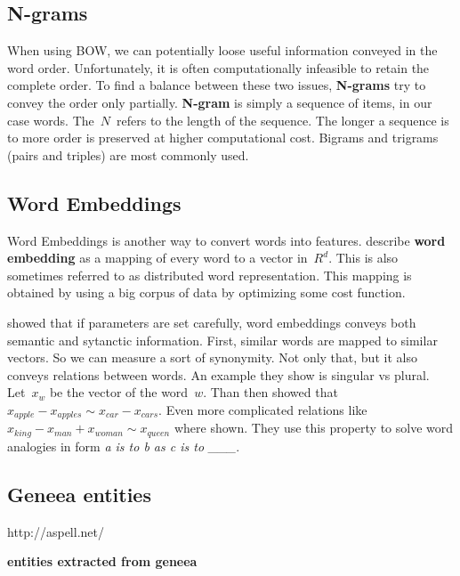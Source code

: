 \subsection{N-grams}

When using BOW, we can potentially loose useful information conveyed in the word order.
Unfortunately, it is often computationally infeasible to retain the complete order.
To find a balance between these two issues, {\bf N-grams} try to convey the order only partially.
{\bf N-gram} is simply a sequence of items, in our case words. The~$N$~refers to the length of the sequence.
The longer a sequence is to more order is preserved at higher computational cost.
Bigrams and trigrams (pairs and triples) are most commonly used.


\subsection{Word Embeddings}
\label{subsec:wordembed}

Word Embeddings is another way to convert words into features.
\citet{LeGo14} describe {\bf word embedding} as a mapping of every word to a vector in~$R^d$.
This is also sometimes referred to as distributed word representation.
This mapping is obtained by using a big corpus of data by optimizing some cost function.

\citet{Mik13} showed that if parameters are set carefully, word embeddings conveys both semantic and sytanctic information.
First, similar words are mapped to similar vectors. So we can measure a sort of synonymity.
Not only that, but it also conveys relations between words.
An example they show is singular vs plural. Let~$x_{w}$ be the vector of the word~$w$.
Than then showed that $x_{apple}-x_{apples} \sim x_{car}-x_{cars}$.
Even more complicated relations like $x_{king} - x_{man} + x_{woman} \sim x_{queen}$ where shown.
They use this property to solve word analogies in form {\it a is to b as c is to \_\_\_}.


\subsection{Geneea entities}http://aspell.net/

\bf entities extracted from geneea \rm


